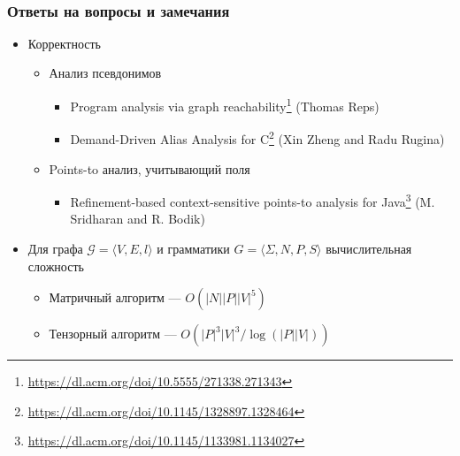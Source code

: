 \documentclass[x11names,dvipsnames,table,aspectratio=169]{beamer}
\begin{document}
\begin{frame}[fragile]\
    \frametitle{Ответы на вопросы и замечания}
    
    \begin{itemize}
        \item Корректность
        \begin{itemize}
            \item Анализ псевдонимов
            \begin{itemize}
                \item Program analysis via graph reachability\footnote{\url{https://dl.acm.org/doi/10.5555/271338.271343}} (Thomas Reps)
                \item Demand-Driven Alias Analysis for C\footnote{\url{https://dl.acm.org/doi/10.1145/1328897.1328464}} (Xin Zheng and Radu Rugina)
            \end{itemize}
            \item Points-to анализ, учитывающий поля
            \begin{itemize}
                \item Refinement-based context-sensitive points-to analysis for Java\footnote{\url{https://dl.acm.org/doi/10.1145/1133981.1134027}} (M. Sridharan and R. Bodik)
            \end{itemize}
        \end{itemize}
        \item Для графа $\mathcal{G}=\langle V,E,l \rangle$ и грамматики $G=\langle \Sigma, N, P, S \rangle$ вычислительная сложность
        \begin{itemize}
            \item Матричный алгоритм --- $O(|N||P||V|^5)$
            \item Тензорный алгоритм --- $O(|P|^3|V|^3 / \log{(|P||V|)})$
        \end{itemize}
    \end{itemize}
\end{frame}
\end{document}
